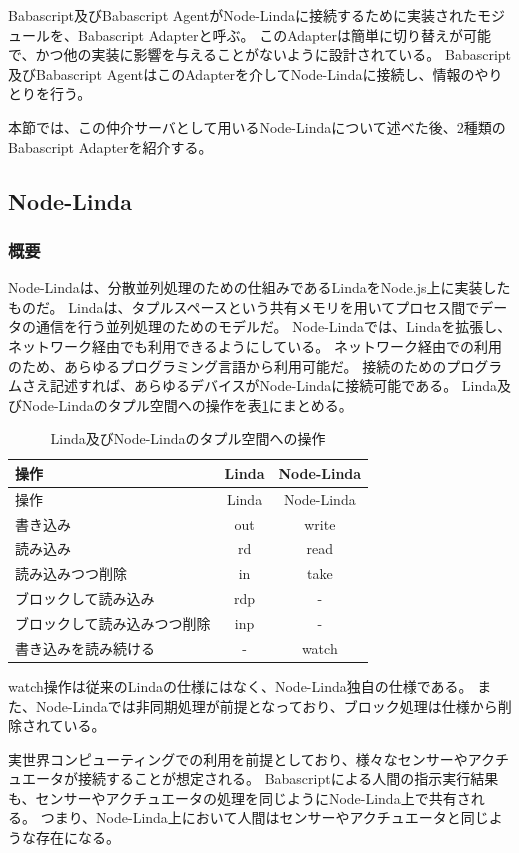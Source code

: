 Babascript及びBabascript
AgentがNode-Lindaに接続するために実装されたモジュールを、Babascript
Adapterと呼ぶ。
このAdapterは簡単に切り替えが可能で、かつ他の実装に影響を与えることがないように設計されている。
Babascript及びBabascript
AgentはこのAdapterを介してNode-Lindaに接続し、情報のやりとりを行う。

本節では、この仲介サーバとして用いるNode-Lindaについて述べた後、2種類のBabascript
Adapterを紹介する。

\subsection{Node-Linda}\label{node-linda}

\subsubsection{概要}\label{ux6982ux8981}

Node-Linda\cite{node-linda}は、分散並列処理のための仕組みであるLinda\cite{linda}をNode.js上に実装したものだ。
Lindaは、タプルスペースという共有メモリを用いてプロセス間でデータの通信を行う並列処理のためのモデルだ。
Node-Lindaでは、Lindaを拡張し、ネットワーク経由でも利用できるようにしている。
ネットワーク経由での利用のため、あらゆるプログラミング言語から利用可能だ。
接続のためのプログラムさえ記述すれば、あらゆるデバイスがNode-Lindaに接続可能である。
Linda及びNode-Lindaのタプル空間への操作を表\ref{table:tuple-management}にまとめる。

\begin{longtable}[c]{@{}lcc@{}}
\caption{Linda及びNode-Lindaのタプル空間への操作
\label{table:tuple-management}}\tabularnewline
\toprule
操作 & Linda & Node-Linda\tabularnewline
\midrule
\endfirsthead
\toprule
操作 & Linda & Node-Linda\tabularnewline
\midrule
\endhead
書き込み & out & write\tabularnewline
読み込み & rd & read\tabularnewline
読み込みつつ削除 & in & take\tabularnewline
ブロックして読み込み & rdp & -\tabularnewline
ブロックして読み込みつつ削除 & inp & -\tabularnewline
書き込みを読み続ける & - & watch\tabularnewline
\bottomrule
\end{longtable}

watch操作は従来のLindaの仕様にはなく、Node-Linda独自の仕様である。
また、Node-Lindaでは非同期処理が前提となっており、ブロック処理は仕様から削除されている。

実世界コンピューティングでの利用を前提としており、様々なセンサーやアクチュエータが接続することが想定される。
Babascriptによる人間の指示実行結果も、センサーやアクチュエータの処理を同じようにNode-Linda上で共有される。
つまり、Node-Linda上において人間はセンサーやアクチュエータと同じような存在になる。

